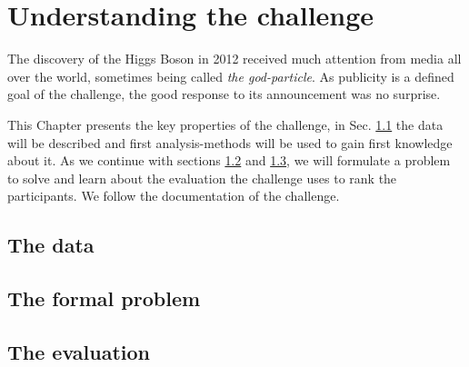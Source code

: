 \section{Understanding the challenge}\label{ch:challenge}

The discovery of the Higgs Boson in 2012 received much attention from media all over the world, sometimes being called \emph{the god-particle}. As publicity is a defined goal of the challenge, the good response to its announcement was no surprise.

This Chapter presents the key properties of the challenge, in Sec. \ref{sec:data} the data will be described and first analysis-methods will be used to gain first knowledge about it.
As we continue with sections \ref{sec:prob} and \ref{sec:eval}, we will formulate a problem to solve and learn about the evaluation the challenge uses to rank the participants. We follow the documentation of the challenge\cite{higgsPaper}.

\subsection{The data}\label{sec:data}



\subsection{The formal problem}\label{sec:prob}



\subsection{The evaluation}\label{sec:eval}




%
\pagebreak

	{\pagebreak \thispagestyle{empty} \cleardoublepage}{\clearpage}